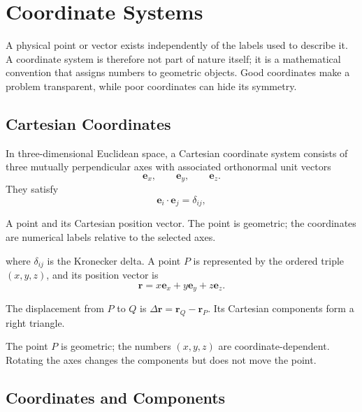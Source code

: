 \section{Coordinate Systems}
\label{sec:coordinate-systems}

A physical point or vector exists independently of the labels used to describe it. A coordinate system is therefore not part of nature itself; it is a mathematical convention that assigns numbers to geometric objects. Good coordinates make a problem transparent, while poor coordinates can hide its symmetry.

\subsection{Cartesian Coordinates}

In three-dimensional Euclidean space, a Cartesian coordinate system consists of three mutually perpendicular axes with associated orthonormal unit vectors
\[
\mathbf e_x,\qquad \mathbf e_y,\qquad \mathbf e_z.
\]
They satisfy
\[
\mathbf e_i\cdot\mathbf e_j=\delta_{ij},
\]

\begin{bookfigure}{A point and its Cartesian position vector. The point is geometric; the coordinates are numerical labels relative to the selected axes.}

\end{bookfigure}
where $\delta_{ij}$ is the Kronecker delta. A point $P$ is represented by the ordered triple $(x,y,z)$, and its position vector is
\[
\mathbf r=x\mathbf e_x+y\mathbf e_y+z\mathbf e_z.
\]

\begin{bookfigure}{The displacement from $P$ to $Q$ is $\Delta\mathbf r=\mathbf r_Q-\mathbf r_P$. Its Cartesian components form a right triangle.}

\label{fig:distance-between-points}
\end{bookfigure}

\begin{physical}
The point $P$ is geometric; the numbers $(x,y,z)$ are coordinate-dependent. Rotating the axes changes the components but does not move the point.
\end{physical}

\subsection{Coordinates and Components}


